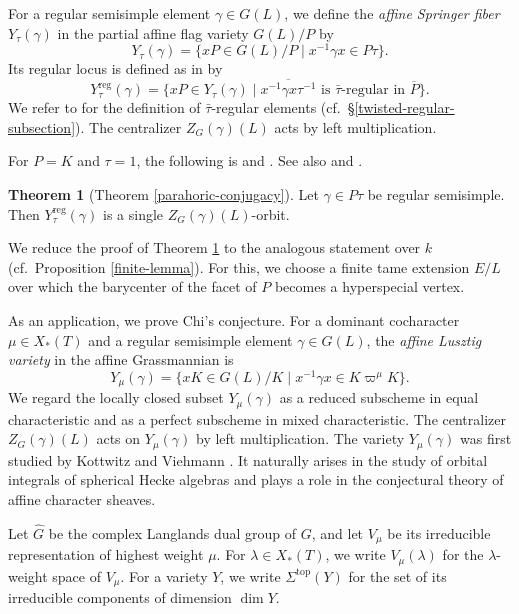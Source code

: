 \documentclass[12pt]{article}
\newcommand\tp{\mathrm{top}}
\newcommand\vp{\varpi}
\theoremstyle{definition}
\newtheorem{thm}{Theorem}[section]
\newcommand{\reg}{\mathrm{reg}}
\begin{document}
For a regular semisimple element $\gamma\in G(L)$, we define the {\it affine Springer fiber} $Y_\tau(\gamma)$ in the partial affine flag variety $G(L)/P$ by
$$
Y_\tau(\gamma)=\{xP\in G(L)/P\mid x^{-1}\gamma x\in P\tau\}.
$$
Its regular locus is defined as in \cite[\S2.4]{He25} by
$$
Y_\tau^{\reg}(\gamma)
=\{xP\in Y_\tau(\gamma)\mid \overline{x^{-1}\gamma x\tau^{-1}}\text{ is $\bar\tau$-regular in }\overline P\}.
$$
We refer to \cite[\S5.5]{HeALV} for the definition of $\bar\tau$-regular elements (cf.\ \S\ref{twisted-regular-subsection}).
The centralizer $Z_G(\gamma)(L)$ acts by left multiplication.

For $P=K$ and $\tau=1$, the following is \cite[Corollary 3.8.2]{Chi22} and \cite[Corollary 7.6]{Chi26}.
See also \cite[Lemma 3.3.1]{Ngo10} and \cite[Theorem 3.5]{He25}.

\begin{thm}[Theorem \ref{parahoric-conjugacy}]\label{main-transitivity}
Let $\gamma\in P\tau$ be regular semisimple.
Then $Y_\tau^{\reg}(\gamma)$ is a single $Z_G(\gamma)(L)$-orbit.
\end{thm}

We reduce the proof of Theorem \ref{main-transitivity} to the analogous statement over $k$ (cf.\ Proposition \ref{finite-lemma}).
For this, we choose a finite tame extension $E/L$ over which the barycenter of the facet of $P$ becomes a hyperspecial vertex.

As an application, we prove Chi's conjecture.
For a dominant cocharacter $\mu\in X_*(T)$ and a regular semisimple element $\gamma\in G(L)$, the {\it affine Lusztig variety} in the affine Grassmannian is
$$
Y_\mu(\gamma)=
\{xK\in G(L)/K\mid x^{-1}\gamma x\in K\vp^\mu K\}.
$$
We regard the locally closed subset $Y_\mu(\gamma)$ as a reduced subscheme in equal characteristic and as a perfect subscheme in mixed characteristic.
The centralizer $Z_G(\gamma)(L)$ acts on $Y_\mu(\gamma)$ by left multiplication.
The variety $Y_\mu(\gamma)$ was first studied by Kottwitz and Viehmann \cite{KV12}.
It naturally arises in the study of orbital integrals of spherical Hecke algebras and plays a role in the conjectural theory of affine character sheaves.

Let $\widehat G$ be the complex Langlands dual group of $G$, and let $V_\mu$ be its irreducible representation of highest weight $\mu$.
For $\lambda\in X_*(T)$, we write $V_\mu(\lambda)$ for the $\lambda$-weight space of $V_\mu$.
For a variety $Y$, we write $\Sigma^{\tp}(Y)$ for the set of its irreducible components of dimension $\dim Y$.
\end{document}
